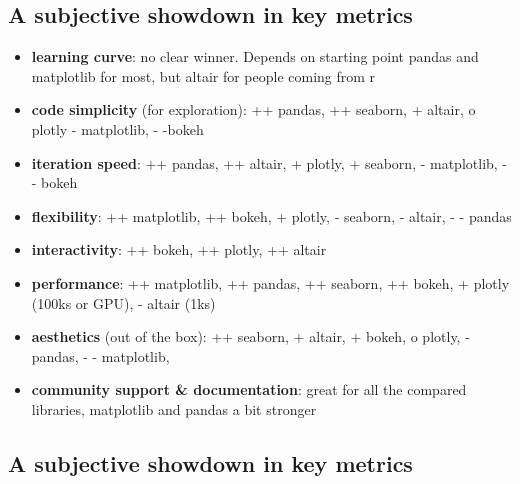 \documentclass[
  letterpaper,
  DIV=11,
  numbers=noendperiod]{scrartcl}
\providecommand{\tightlist}{%
  \setlength{\itemsep}{0pt}\setlength{\parskip}{0pt}}\usepackage{longtable,booktabs,array}
\begin{document}
\hypertarget{a-subjective-showdown-in-key-metrics}{%
\subsection{A subjective showdown in key
metrics}\label{a-subjective-showdown-in-key-metrics}}

\begin{itemize}
\tightlist
\item
  \textbf{learning curve}: no clear winner. Depends on starting point
  pandas and matplotlib for most, but altair for people coming from r
\item
  \textbf{code simplicity} (for exploration): ++ pandas, ++ seaborn, +
  altair, o plotly - matplotlib, - -bokeh
\item
  \textbf{iteration speed}: ++ pandas, ++ altair, + plotly, + seaborn, -
  matplotlib, - - bokeh
\item
  \textbf{flexibility}: ++ matplotlib, ++ bokeh, + plotly, - seaborn, -
  altair, - - pandas
\item
  \textbf{interactivity}: ++ bokeh, ++ plotly, ++ altair
\item
  \textbf{performance}: ++ matplotlib, ++ pandas, ++ seaborn, ++ bokeh,
  + plotly (100ks or GPU), - altair (1ks)
\item
  \textbf{aesthetics} (out of the box): ++ seaborn, + altair, + bokeh, o
  plotly, - pandas, - - matplotlib,\\
\item
  \textbf{community support \& documentation}: great for all the
  compared libraries, matplotlib and pandas a bit stronger
\end{itemize}

\hypertarget{a-subjective-showdown-in-key-metrics-1}{%
\subsection{A subjective showdown in key
metrics}\label{a-subjective-showdown-in-key-metrics-1}}
\end{document}
